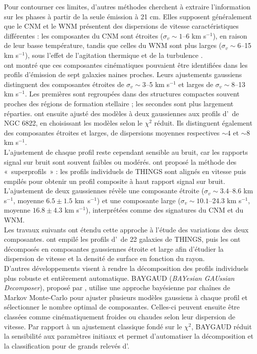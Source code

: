 Pour contourner ces limites, d'autres méthodes cherchent à extraire l'information sur les phases à partir de la seule émission à 21 cm. Elles supposent généralement que le CNM et le WNM présentent des dispersions de vitesse caractéristiques différentes : les composantes du CNM sont étroites ($\sigma_v \sim 1$--6 km s$^{-1}$), en raison de leur basse température, tandis que celles du WNM sont plus larges ($\sigma_v \sim 6$--15 km s$^{-1}$), sous l'effet de l'agitation thermique et de la turbulence \citep{Young2003, deBlok2006, Ianjamasimanana2012}.\\\indent
\citet{Young2003} ont montré que ces composantes cinématiques pouvaient être identifiées dans les profils d'émission de sept galaxies naines proches. Leurs ajustements gaussiens distinguent des composantes étroites de $\sigma_v \sim 3$--5 km s$^{-1}$ et larges de $\sigma_v \sim 8$--13 km s$^{-1}$. Les premières sont regroupées dans des structures compactes souvent proches des régions de formation stellaire ; les secondes sont plus largement réparties. \citet{deBlok2006} ont ensuite ajusté des modèles à deux gaussiennes aux profils d'\HI\ de NGC 6822, en choisissant les modèles selon le $\chi^2$ réduit. Ils distinguent également des composantes étroites et larges, de dispersions moyennes respectives $\sim4$ et $\sim8$ km s$^{-1}$.\\\indent
L'ajustement de chaque profil reste cependant sensible au bruit, car les rapports signal sur bruit sont souvent faibles ou modérés. \citet{Ianjamasimanana2012} ont proposé la méthode des «~superprofils~» : les profils individuels de THINGS sont alignés en vitesse puis empilés pour obtenir un profil composite à haut rapport signal sur bruit. L'ajustement de deux gaussiennes révèle une composante étroite ($\sigma_v \sim 3.4$--8.6 km s$^{-1}$, moyenne $6.5\pm1.5$ km~s$^{-1}$) et une composante large ($\sigma_v \sim 10.1$--24.3 km s$^{-1}$, moyenne $16.8\pm4.3$ km s$^{-1}$), interprétées comme des signatures du CNM et du WNM.\\\indent
Les travaux suivants ont étendu cette approche à l'étude des variations des deux composantes. \citet{Ianjamasimanana2015} ont empilé les profils d'\HI\ de 22 galaxies de THINGS, puis les ont décomposés en composantes gaussiennes étroite et large afin d'étudier la dispersion de vitesse et la densité de surface en fonction du rayon.\\\indent
D'autres développements visent à rendre la décomposition des profils individuels plus robuste et entièrement automatique. BAYGAUD (\textit{BAYesian GAUssian Decomposer}), proposé par \citet{Oh2019}, utilise une approche bayésienne par chaînes de Markov Monte-Carlo pour ajuster plusieurs modèles gaussiens à chaque profil et sélectionner le nombre optimal de composantes. Celles-ci peuvent ensuite être classées comme cinématiquement froides ou chaudes selon leur dispersion de vitesse. Par rapport à un ajustement classique fondé sur le $\chi^2$, BAYGAUD réduit la sensibilité aux paramètres initiaux et permet d'automatiser la décomposition et la classification pour de grands relevés d'\HI.\\\indent
